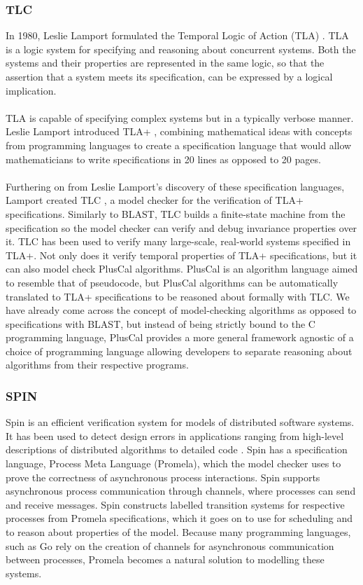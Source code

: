 \subsubsection*{\textbf{TLC}}
In 1980, Leslie Lamport formulated the Temporal Logic of Action (TLA) \cite{tla}. TLA is a logic system for specifying and reasoning about concurrent systems. Both the systems and their properties are represented in the same logic, so that the assertion that a system meets its specification, can be expressed by a logical implication.
\\ \\
TLA is capable of specifying complex systems but in a typically verbose manner. Leslie Lamport introduced TLA+ \cite{tlaplus}, combining mathematical ideas with concepts from programming languages to create a specification language that would allow mathematicians to write specifications in 20 lines as opposed to 20 pages.
\\ \\
Furthering on from Leslie Lamport's discovery of these specification languages, Lamport created TLC \cite{tlc}, a model checker for the verification of TLA+ specifications. Similarly to BLAST, TLC builds a finite-state machine from the specification so the model checker can verify and debug invariance properties over it. TLC has been used to verify many large-scale, real-world systems specified in TLA+. Not only does it verify temporal properties of TLA+ specifications, but it can also model check PlusCal \cite{pluscal} algorithms. PlusCal is an algorithm language aimed to resemble that of pseudocode, but PlusCal algorithms can be automatically translated to TLA+ specifications to be reasoned about formally with TLC. We have already come across the concept of model-checking algorithms as opposed to specifications with BLAST, but instead of being strictly bound to the C programming language, PlusCal provides a more general framework agnostic of a choice of programming language allowing developers to separate reasoning about algorithms from their respective programs.

\subsubsection*{\textbf{SPIN}}
Spin is an efficient verification system for models of distributed software systems. It has been used to detect design errors in applications ranging from high-level descriptions of distributed algorithms to detailed code \cite{spin}. Spin has a specification language, Process Meta Language (Promela), which the model checker uses to prove the correctness of asynchronous process interactions. Spin supports asynchronous process communication through channels, where processes can send and receive messages. Spin constructs labelled transition systems for respective processes from Promela specifications, which it goes on to use for scheduling and to reason about properties of the model. Because many programming languages, such as Go \cite{go} rely on the creation of channels for asynchronous communication between processes, Promela becomes a natural solution to modelling these systems.
